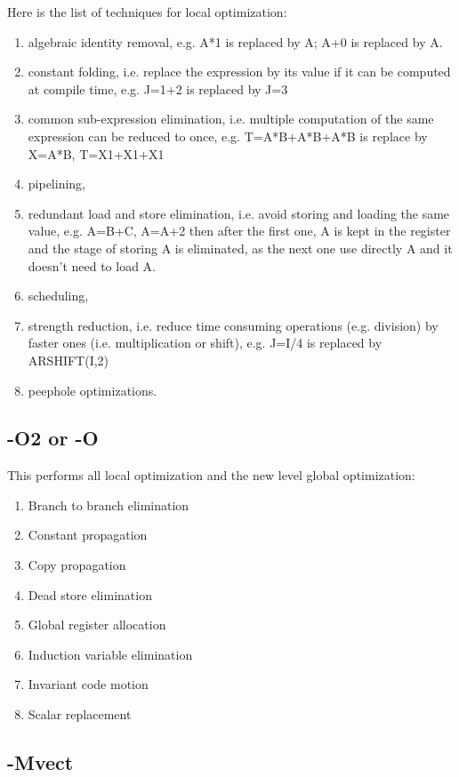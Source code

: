 Here is the list of techniques for local optimization:
\begin{enumerate}
\item algebraic identity removal, e.g. A*1 is replaced by A; A+0 is
  replaced by A.
\item constant folding, i.e. replace the expression by its value if it
  can be computed at compile time, e.g. J=1+2 is replaced by J=3
\item common sub-expression elimination, i.e. multiple computation of
  the same expression can be reduced to once, e.g. T=A*B+A*B+A*B is
  replace by X=A*B, T=X1+X1+X1
\item pipelining, 
\item redundant load and store elimination, i.e. avoid storing and
  loading the same value, e.g. A=B+C, A=A+2 then after the first one,
  A is kept in the register and the stage of storing A is eliminated,
  as the next one use directly A and it doesn't need to load A.
\item scheduling, 
\item strength reduction, i.e. reduce time consuming operations
  (e.g. division) by faster ones (i.e. multiplication or shift),
  e.g. J=I/4 is replaced by ARSHIFT(I,2)
\item peephole optimizations.
\end{enumerate}

\subsection{-O2 or -O}
\label{sec:-o2}

This performs all local optimization and the new level global
optimization: 

\begin{enumerate}
\item   Branch to branch elimination
\item Constant propagation
\item Copy propagation
\item Dead store elimination
\item Global register allocation
\item Induction variable elimination
\item Invariant code motion
\item Scalar replacement
\end{enumerate}
\subsection{-Mvect}
\label{sec:-mvect}

